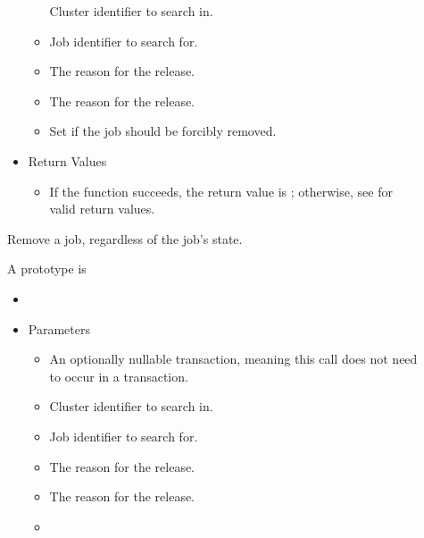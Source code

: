 \begin{description}
\begin{itemize}
\begin{itemize}
      Cluster identifier to search in.
      \item[] 

      Job identifier to search for.
      \item[] 

      The reason for the release.
      \item[] 

      The reason for the release.      
      \item[] 

      Set if the job should be forcibly removed.
    \end{itemize}
    \item[] Return Values
    \begin{itemize}
      \item[] If the function succeeds, the return value is ; 
      otherwise, see  for valid return values.
    \end{itemize}
  \end{itemize}   

  Remove a job, regardless of the job's state.

\item [\Code{holdJob}]
  A prototype is 

  \begin{itemize}
    \item[] 
    \item[] Parameters
    \begin{itemize}
      \item[]  

      An optionally nullable transaction, meaning this call does not 
      need to occur in a transaction. 
      \item[]  

      Cluster identifier to search in.
      \item[] 

      Job identifier to search for.
      \item[] 

      The reason for the release.
      \item[] 

      The reason for the release.      
      \item[] 


\end{itemize}
\end{itemize}
\end{description}
